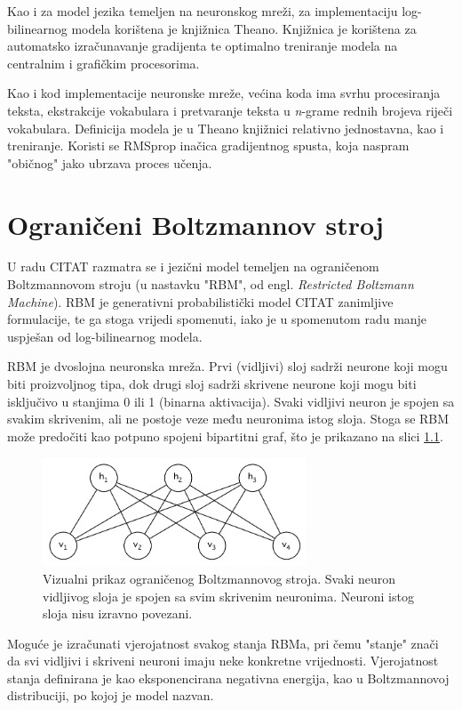\documentclass[times, utf8, diplomski, numeric]{fer}
\begin{document}
Kao i za model jezika temeljen na neuronskog mreži, za implementaciju log-bilinearnog modela korištena je knjižnica Theano. Knjižnica je korištena za automatsko izračunavanje gradijenta te optimalno treniranje modela na centralnim i grafičkim procesorima.

Kao i kod implementacije neuronske mreže, većina koda ima svrhu procesiranja teksta, ekstrakcije vokabulara i pretvaranje teksta u \textit{n}-grame rednih brojeva riječi vokabulara. Definicija modela je u Theano knjižnici relativno jednostavna, kao i treniranje. Koristi se RMSprop inačica gradijentnog spusta, koja naspram "običnog" jako ubrzava proces učenja.

\chapter{Ograničeni Boltzmannov stroj}

U radu CITAT razmatra se i jezični model temeljen na ograničenom Boltzmannovom stroju (u nastavku "RBM", od engl. \textit{Restricted Boltzmann Machine}). RBM je generativni probabilistički model CITAT zanimljive formulacije, te ga stoga vrijedi spomenuti, iako je u spomenutom radu manje uspješan od log-bilinearnog modela.

RBM je dvoslojna neuronska mreža. Prvi (vidljivi) sloj sadrži neurone koji mogu biti proizvoljnog tipa, dok drugi sloj sadrži skrivene neurone koji mogu biti isključivo u stanjima 0 ili 1 (binarna aktivacija). Svaki vidljivi neuron je spojen sa svakim skrivenim, ali ne postoje veze među neuronima istog sloja. Stoga se RBM može predočiti kao potpuno spojeni bipartitni graf, što je prikazano na slici \ref{fig:rbm}.

\begin{figure}[!htb]
\centering
\includegraphics[width=0.7\textwidth]{fig/rbm_ex1.pdf}
\caption{Vizualni prikaz ograničenog Boltzmannovog stroja. Svaki neuron vidljivog sloja je spojen sa svim skrivenim neuronima. Neuroni istog sloja nisu izravno povezani.}
\label{fig:rbm}
\end{figure}

Moguće je izračunati vjerojatnost svakog stanja RBMa, pri čemu "stanje" znači da svi vidljivi i skriveni neuroni imaju neke konkretne vrijednosti. Vjerojatnost stanja definirana je kao eksponencirana negativna energija, kao u Boltzmannovoj distribuciji, po kojoj je model nazvan.
\end{document}
